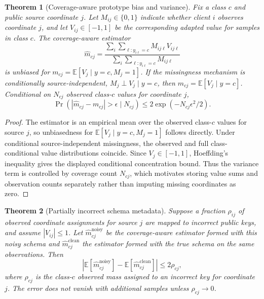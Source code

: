 \documentclass[preprint]{elsarticle}
\newcommand{\E}{\mathbb{E}}
\newtheorem{theorem}{Theorem}
\begin{document}
\begin{theorem}[Coverage-aware prototype bias and variance]
\label{thm:coverage-estimator}
Fix a class \(c\) and public source coordinate \(j\). Let \(M_{ij}\in\{0,1\}\) indicate whether client \(i\) observes coordinate \(j\), and let \(V_{ij}\in[-1,1]\) be the corresponding adapted value for samples in class \(c\). The coverage-aware estimator
\begin{equation}
    \hat{m}_{cj}
    =
    \frac{\sum_i\sum_{\ell:y_{i\ell}=c}M_{ij\ell}V_{ij\ell}}
    {\sum_i\sum_{\ell:y_{i\ell}=c}M_{ij\ell}}
\end{equation}
is unbiased for \(m_{cj}=\E[V_j\mid y=c,M_j=1]\). If the missingness mechanism is conditionally source-independent, \(M_j\perp V_j\mid y=c\), then \(m_{cj}=\E[V_j\mid y=c]\). Conditional on \(N_{cj}\) observed class-\(c\) values for coordinate \(j\),
\begin{equation}
    \Pr(|\hat{m}_{cj}-m_{cj}|>\epsilon\mid N_{cj})
    \le 2\exp(-N_{cj}\epsilon^2/2).
\end{equation}
\end{theorem}

\begin{proof}
The estimator is an empirical mean over the observed class-\(c\) values for source \(j\), so unbiasedness for \(\E[V_j\mid y=c,M_j=1]\) follows directly. Under conditional source-independent missingness, the observed and full class-conditional value distributions coincide. Since \(V_j\in[-1,1]\), Hoeffding's inequality gives the displayed conditional concentration bound. Thus the variance term is controlled by coverage count \(N_{cj}\), which motivates storing value sums and observation counts separately rather than imputing missing coordinates as zero.
\end{proof}

\begin{theorem}[Partially incorrect schema metadata]
\label{thm:noisy-schema}
Suppose a fraction \(\rho_{ij}\) of observed coordinate assignments for source \(j\) are mapped to incorrect public keys, and assume \(|V_{ij}|\le1\). Let \(\hat{m}_{cj}^{\mathrm{noisy}}\) be the coverage-aware estimator formed with this noisy schema and \(\hat{m}_{cj}^{\mathrm{clean}}\) the estimator formed with the true schema on the same observations. Then
\begin{equation}
    |\E[\hat{m}_{cj}^{\mathrm{noisy}}]-\E[\hat{m}_{cj}^{\mathrm{clean}}]|
    \le 2\rho_{cj},
\end{equation}
where \(\rho_{cj}\) is the class-\(c\) observed mass assigned to an incorrect key for coordinate \(j\). The error does not vanish with additional samples unless \(\rho_{cj}\to0\).
\end{theorem}
\end{document}
